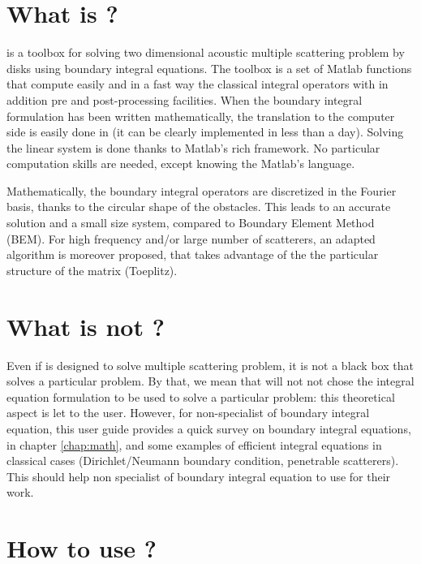 \mtcaddchapter[Introduction]                          %

\section*{What is \mudiff?}

\mudiff is a toolbox for solving two dimensional acoustic multiple scattering problem by disks using boundary integral equations. The toolbox is a set of Matlab functions that compute easily and in a fast way the classical integral operators with in addition pre and post-processing facilities. When the boundary integral formulation has been written mathematically, the translation to the computer side is easily done in \mudiff (it can be clearly implemented in less than a day). Solving the linear system is done thanks to Matlab's rich framework. No particular computation skills are needed, except knowing the Matlab's language.

Mathematically, the boundary integral operators are discretized in the Fourier basis, thanks to the circular shape of the obstacles. This leads to an accurate solution and a small size system, compared to \eg Boundary Element Method (BEM). For high frequency and/or large number of scatterers, an adapted algorithm is moreover proposed, that takes advantage of the the particular structure of the matrix (Toeplitz).

\section*{What is not \mudiff?}

Even if \mudiff is designed to solve multiple scattering problem, it is not a black box that solves a particular problem. By that, we mean that \mudiff will not not chose the integral equation formulation to be used to solve a particular problem: this theoretical aspect is let to the user. However, for non-specialist of boundary integral equation, this user guide provides a quick survey on boundary integral equations, in chapter \ref{chap:math}, and some examples of efficient integral equations in classical cases (Dirichlet/Neumann boundary condition, penetrable scatterers). This should help non specialist of boundary integral equation to use \mudiff for their work.

\section*{How to use \mudiff?}


